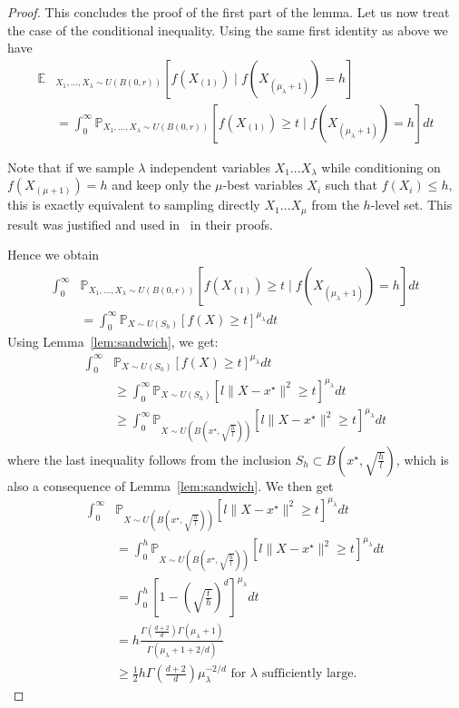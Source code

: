 \begin{proof}
This concludes the proof of the first part of the lemma. Let us now treat the case of the conditional inequality. Using the same first identity as above we have
\begin{align*}
\mathbb{E}&_{X_1,\dots,X_\lambda\sim U(B(0,r))}\left[ f\left(X_{(1)}\right)\mid f(X_{(\mu_{\lambda}+1)}) = h\right] \\
&= \int_0^\infty \mathbb{P}_{X_1,\dots,X_\lambda\sim U(B(0,r))}\left[ f\left(X_{(1)}\right)\geq t \mid f(X_{({\mu_{\lambda}}+1)}) = h\right] dt
\end{align*}
%
\begin{rmq}
\label{rk:samples}
Note that if we sample $\lambda$ independent variables $X_1 \ldots X_\lambda$ while conditioning on $f(X_{(\mu+1)})=h$ %
and keep only the $\mu$-best variables $X_i$ such that $f(X_i)\le h$, this is exactly equivalent to sampling directly $X_1 \ldots X_\mu$ from the $h$-level set. This result was justified and used in~\cite{ppsnkbest} in their proofs.
\end{rmq}
%
Hence we obtain
\begin{align*}
 \int_0^\infty &\mathbb{P}_{X_1,\dots,X_\lambda\sim U(B(0,r))}\left[ f\left(X_{(1)}\right)\geq t \mid f(X_{(\mu_{\lambda}+1)})= h\right] dt\\ 
 & = \int_0^\infty \mathbb{P}_{X\sim U(S_h)}\left[ f\left(X\right)\geq t\right]^{\mu_{\lambda}} dt
 \end{align*}
 Using Lemma~\ref{lem:sandwich}, we get:
 \begin{align*}
 \int_0^\infty& \mathbb{P}_{X\sim U(S_h)}\left[ f\left(X\right)\geq t\right]^{\mu_{\lambda}} dt\\
& \geq \int_0^\infty \mathbb{P}_{X\sim U(S_h)}\left[ l\lVert X-x^\star\rVert^2 \geq t\right]^{\mu_{\lambda}} dt\\
& \geq \int_0^\infty \mathbb{P}_{X\sim U(B(x^\star,\sqrt{\frac{h}{l}}))}\left[ l\lVert X-x^\star\rVert^2 \geq t\right]^{\mu_{\lambda}} dt
\end{align*}
where the last inequality follows from the inclusion $S_h\subset B(x^\star,\sqrt{\frac{h}{l}})$, which is also a consequence of Lemma~\ref{lem:sandwich}. We then get
\begin{align*}
\int_0^\infty& \mathbb{P}_{X\sim U(B(x^\star,\sqrt{\frac{h}{l}}))}\left[ l\lVert X-x^\star\rVert^2 \geq t\right]^{\mu_{\lambda}} dt\\
& = \int_0^h \mathbb{P}_{X\sim U(B(x^\star,\sqrt{\frac{h}{l}}))}\left[ l\lVert X-x^\star\rVert^2 \geq t\right]^{\mu_{\lambda}} dt\\
& = \int_0^{h} \left[ 1-\left(\sqrt{\frac{t}{h}}\right)^d\right]^{\mu_{\lambda}} dt\\
& = h\frac{\Gamma(\frac{d+2}{d})\Gamma(\mu_\lambda+1)}{\Gamma(\mu_\lambda+1+2/d)}\\
& \geq \frac12 h \Gamma(\frac{d+2}{d})\mu_\lambda^{-2/d}\text{ for $\lambda$ sufficiently large.}
\end{align*}
\end{proof}
